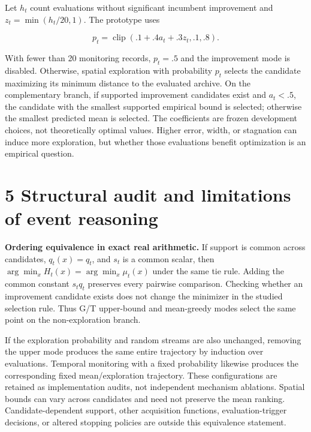 \documentclass[11pt,a4paper]{article}
\begin{document}
\par\noindent\begin{minipage}{\linewidth}

Let \(h_t\) count evaluations without significant incumbent improvement
and \(z_t=\min(h_t/20,1)\). The prototype uses

\[p_t=\operatorname{clip}(.1+.4a_t+.3z_t,.1,.8).\]

\end{minipage}\par

With fewer than 20 monitoring records, \(p_t=.5\) and the improvement
mode is disabled. Otherwise, spatial exploration with probability
\(p_t\) selects the candidate maximizing its minimum distance to the
evaluated archive. On the complementary branch, if supported improvement
candidates exist and \(a_t<.5\), the candidate with the smallest
supported empirical bound is selected; otherwise the smallest predicted
mean is selected. The coefficients are frozen development choices, not
theoretically optimal values. Higher error, width, or stagnation can
induce more exploration, but whether those evaluations benefit
optimization is an empirical question.

\hypertarget{structural-audit-and-limitations-of-event-reasoning}{%
\section{5 Structural audit and limitations of event
reasoning}\label{structural-audit-and-limitations-of-event-reasoning}}

\textbf{Ordering equivalence in exact real arithmetic.} If support is
common across candidates, \(q_t(x)=q_t\), and \(s_t\) is a common
scalar, then \(\arg\min_xH_t(x)=\arg\min_x\mu_t(x)\) under the same tie
rule. Adding the common constant \(s_tq_t\) preserves every pairwise
comparison. Checking whether an improvement candidate exists does not
change the minimizer in the studied selection rule. Thus G/T upper-bound
and mean-greedy modes select the same point on the non-exploration
branch.

If the exploration probability and random streams are also unchanged,
removing the upper mode produces the same entire trajectory by induction
over evaluations. Temporal monitoring with a fixed probability likewise
produces the corresponding fixed mean/exploration trajectory. These
configurations are retained as implementation audits, not independent
mechanism ablations. Spatial bounds can vary across candidates and need
not preserve the mean ranking. Candidate-dependent support, other
acquisition functions, evaluation-trigger decisions, or altered stopping
policies are outside this equivalence statement.
\end{document}
